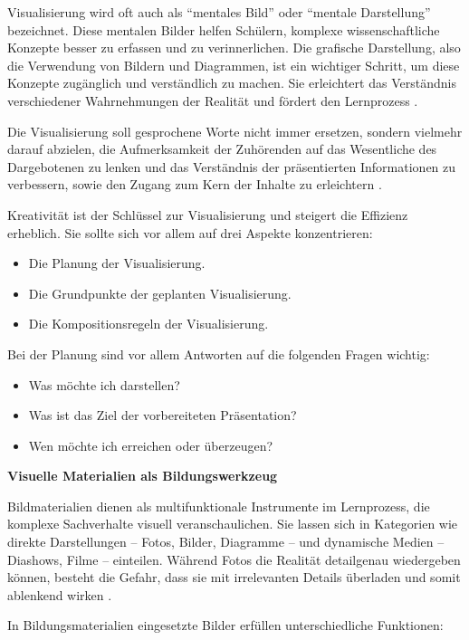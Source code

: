 Visualisierung wird oft auch als \enquote{mentales Bild} oder \enquote{mentale Darstellung} bezeichnet. Diese mentalen Bilder helfen Schülern, komplexe wissenschaftliche Konzepte besser zu erfassen und zu verinnerlichen. Die grafische Darstellung, also die Verwendung von Bildern und Diagrammen, ist ein wichtiger Schritt, um diese Konzepte zugänglich und verständlich zu machen. Sie erleichtert das Verständnis verschiedener Wahrnehmungen der Realität und fördert den Lernprozess \cite{Duval1999}.

Die Visualisierung soll gesprochene Worte nicht immer ersetzen, sondern vielmehr darauf abzielen, die Aufmerksamkeit der Zuhörenden auf das Wesentliche des Dargebotenen zu lenken und das Verständnis der präsentierten Informationen zu verbessern, sowie den Zugang zum Kern der Inhalte zu erleichtern \cite{Gilbert2005}.

Kreativität ist der Schlüssel zur Visualisierung und steigert die Effizienz erheblich. Sie sollte sich vor allem auf drei Aspekte konzentrieren:
\begin{itemize}
	\item Die Planung der Visualisierung.
	\item Die Grundpunkte der geplanten Visualisierung.
	\item Die Kompositionsregeln der Visualisierung.
\end{itemize}

Bei der Planung sind vor allem Antworten auf die folgenden Fragen wichtig:
\begin{itemize}
	\item Was möchte ich darstellen?
	\item Was ist das Ziel der vorbereiteten Präsentation?
	\item Wen möchte ich erreichen oder überzeugen?
\end{itemize}

\textbf{Visuelle Materialien als Bildungswerkzeug}

Bildmaterialien dienen als multifunktionale Instrumente im Lernprozess, die komplexe Sachverhalte visuell veranschaulichen. Sie lassen sich in Kategorien wie direkte Darstellungen – Fotos, Bilder, Diagramme – und dynamische Medien – Diashows, Filme – einteilen. Während Fotos die Realität detailgenau wiedergeben können, besteht die Gefahr, dass sie mit irrelevanten Details überladen und somit ablenkend wirken \cite{Vermirovsky2010ImportanceVisualisation}. 

In Bildungsmaterialien eingesetzte Bilder erfüllen unterschiedliche Funktionen:

